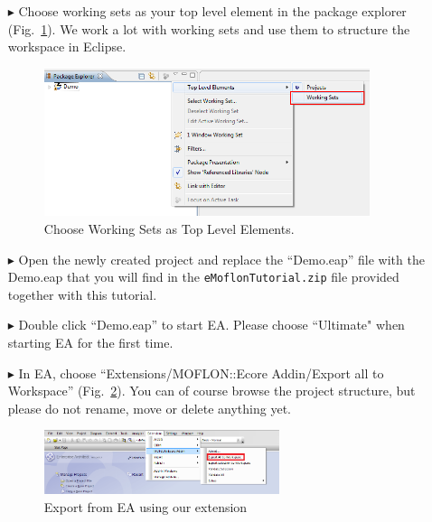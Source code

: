 \begin{enumerate}
\item[$\blacktriangleright$] Choose working sets as your top level element in
the package explorer (Fig.~\ref{fig_eclipseWorkingsets}).
We work a lot with working sets and use them to structure the workspace in
Eclipse.
\begin{figure}[!h]
	\centering
  \includegraphics[width=0.9\textwidth]{pics/installationAndSetup/eclipse_workingsets.png}
	\caption{Choose Working Sets as Top Level Elements.}
	\label{fig_eclipseWorkingsets}
\end{figure}

\item[$\blacktriangleright$] Open the newly created project and replace the
``Demo.eap'' file with the Demo.eap that you will find in the
\texttt{eMoflonTutorial.zip} file provided together with this tutorial. 

\item[$\blacktriangleright$] Double click ``Demo.eap'' to start EA.
Please choose ``Ultimate" when starting EA for the first time.

\item[$\blacktriangleright$] In EA, choose ``Extensions/MOFLON::Ecore Addin/Export
all to Workspace'' (Fig.~\ref{fig_ea}).  You can of course browse the project
structure, but please do not rename, move or delete anything yet.
\begin{figure}[!h]
	\centering
  \includegraphics[width=0.65\textwidth]{pics/installationAndSetup/ea_firststart}
	\caption{Export from EA using our extension} 
	\label{fig_ea} 
\end{figure}

\newpage


\end{enumerate}
